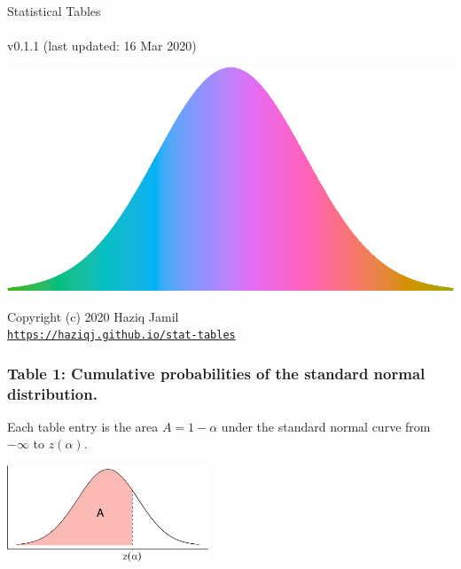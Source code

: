 \documentclass[]{article}
\author{}
\date{\vspace{-2.5em}}
\begin{document}
\thispagestyle{empty}
\begin{center}
~\\
\vspace{2cm}
{\Huge Statistical Tables}
~\\~\\
v0.1.1 (last updated: 16 Mar 2020)
\vspace{5cm}
\end{center}

\begin{center}\includegraphics[width=\textwidth]{stat-tables_files/figure-latex/unnamed-chunk-1-1} \end{center}

\vfill
\begin{center}
Copyright (c) 2020 Haziq Jamil
~\\
\href{https://haziqj.github.io/stat-tables}{\texttt{https://haziqj.github.io/stat-tables}}
\end{center}

\newpage

\hypertarget{table-1-cumulative-probabilities-of-the-standard-normal-distribution.}{%
\subsubsection{Table 1: Cumulative probabilities of the standard normal
distribution.}\label{table-1-cumulative-probabilities-of-the-standard-normal-distribution.}}

Each table entry is the area \(A=1-\alpha\) under the standard normal
curve from \(-\infty\) to \(z(\alpha)\).

\vspace{1em}

\begin{center}\includegraphics[width=6cm]{stat-tables_files/figure-latex/unnamed-chunk-2-1} \end{center}
\end{document}
